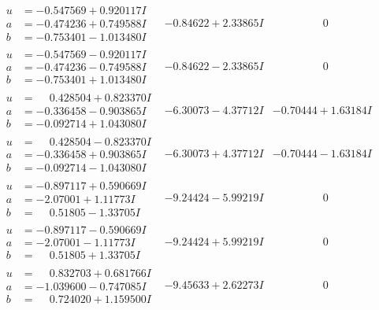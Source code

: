 \documentclass[1p]{elsarticle_modified}
\theoremstyle{definition}
\begin{document}
$$\begin{array}{c|c|c}
\begin{aligned}
u &= -0.547569 + 0.920117 I \\
a &= -0.474236 + 0.749588 I \\
b &= -0.753401 - 1.013480 I\end{aligned}
 & -0.84622 + 2.33865 I & \phantom{-0.000000 } 0 \\ \hline\begin{aligned}
u &= -0.547569 - 0.920117 I \\
a &= -0.474236 - 0.749588 I \\
b &= -0.753401 + 1.013480 I\end{aligned}
 & -0.84622 - 2.33865 I & \phantom{-0.000000 } 0 \\ \hline\begin{aligned}
u &= \phantom{-}0.428504 + 0.823370 I \\
a &= -0.336458 - 0.903865 I \\
b &= -0.092714 + 1.043080 I\end{aligned}
 & -6.30073 - 4.37712 I & -0.70444 + 1.63184 I \\ \hline\begin{aligned}
u &= \phantom{-}0.428504 - 0.823370 I \\
a &= -0.336458 + 0.903865 I \\
b &= -0.092714 - 1.043080 I\end{aligned}
 & -6.30073 + 4.37712 I & -0.70444 - 1.63184 I \\ \hline\begin{aligned}
u &= -0.897117 + 0.590669 I \\
a &= -2.07001 + 1.11773 I \\
b &= \phantom{-}0.51805 - 1.33705 I\end{aligned}
 & -9.24424 - 5.99219 I & \phantom{-0.000000 } 0 \\ \hline\begin{aligned}
u &= -0.897117 - 0.590669 I \\
a &= -2.07001 - 1.11773 I \\
b &= \phantom{-}0.51805 + 1.33705 I\end{aligned}
 & -9.24424 + 5.99219 I & \phantom{-0.000000 } 0 \\ \hline\begin{aligned}
u &= \phantom{-}0.832703 + 0.681766 I \\
a &= -1.039600 - 0.747085 I \\
b &= \phantom{-}0.724020 + 1.159500 I\end{aligned}
 & -9.45633 + 2.62273 I & \phantom{-0.000000 } 0 \\ \hline\begin{aligned}

\end{aligned}
\end{array}$$
\end{document}
